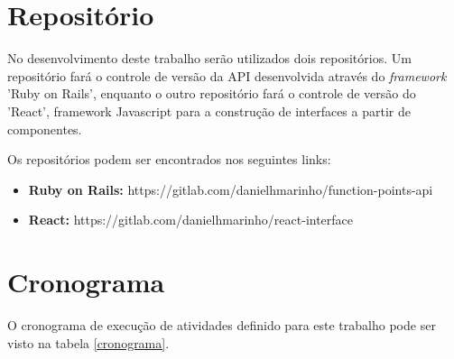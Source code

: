 \section{Repositório}

No desenvolvimento deste trabalho serão utilizados dois repositórios. Um repositório fará o controle de versão da API desenvolvida através do \textit{framework} 'Ruby on Rails', enquanto o outro repositório fará o controle de versão do 'React', framework Javascript  para a construção de interfaces a partir de componentes.

Os repositórios podem ser encontrados nos seguintes links:

\begin{itemize}

\item \textbf{Ruby on Rails:}
https://gitlab.com/danielhmarinho/function-points-api

\item \textbf{React:} https://gitlab.com/danielhmarinho/react-interface

\end{itemize}

\section{Cronograma}

O cronograma de execução de atividades definido para este trabalho pode ser visto na tabela \ref{cronograma}.

